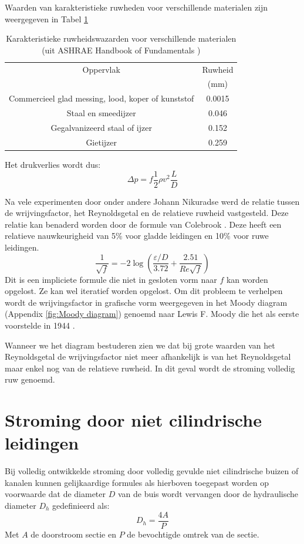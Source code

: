 Waarden van karakteristieke ruwheden voor verschillende materialen zijn weergegeven in Tabel \ref{tab:ruwheid van materialen}
\begin{table}[htb]
	\centering
	\begin{tabular}{cc}
		\hline
		Oppervlak & Ruwheid \\
		   & (mm) \\
		\hline
		Commercieel glad messing, lood, koper of kunststof & 0.0015 \\
		Staal en smeedijzer & 0.046 \\
		Gegalvanizeerd staal of ijzer & 0.152 \\
		Gietijzer & 0.259 \\
		\hline
	\end{tabular}
	\caption{Karakteristieke ruwheidswazarden voor verschillende materialen (uit ASHRAE Handbook of Fundamentals \cite{ASHRAE_Fundamentals})}
	\label{tab:ruwheid van materialen}
\end{table}
Het drukverlies wordt dus:
\begin{equation}
	\Delta p = f \frac{1}{2}\rho v^2 \frac{L}{D}
	\label{eqn:drukval bij turbulente stroming}
\end{equation}

Na vele experimenten door onder andere Johann Nikuradse \cite{Nikuradse1926} werd de relatie tussen de wrijvingsfactor, het Reynoldsgetal en de relatieve ruwheid vastgesteld. Deze relatie kan benaderd worden door de formule van Colebrook \cite{Colebrook1937}. Deze heeft een relatieve nauwkeurigheid van 5\% voor gladde leidingen en 10\% voor ruwe leidingen.
\begin{equation}
	\frac{1}{\sqrt{f}} = -2 \log \left( \frac{\varepsilon/D}{3.72} + \frac{2.51}{Re \sqrt{f}} \right)
\end{equation}
Dit is een impliciete formule die niet in gesloten vorm naar $f$ kan worden opgelost. Ze kan wel iteratief worden opgelost.  Om dit probleem te verhelpen wordt de wrijvingsfactor in grafische vorm weergegeven in het Moody diagram (Appendix \ref{fig:Moody diagram}) genoemd naar Lewis F. Moody die het als eerste voorstelde in 1944 \cite{Moody1944}.

Wanneer we het diagram bestuderen zien we dat bij grote waarden van het Reynoldsgetal de wrijvingsfactor niet meer afhankelijk is van het Reynoldsgetal maar enkel nog van de relatieve ruwheid. In dit geval wordt de stroming volledig ruw genoemd.

		\section{Stroming door niet cilindrische leidingen}
Bij volledig ontwikkelde stroming door volledig gevulde niet cilindrische buizen of kanalen kunnen gelijkaardige formules als hierboven toegepast worden op voorwaarde dat de diameter $D$ van de buis wordt vervangen door de hydraulische diameter $D_h$ gedefinieerd als:
\begin{equation}
	D_h = \frac{4 A}{P}
\end{equation}
Met $A$ de doorstroom sectie en $P$ de bevochtigde omtrek van de sectie.
	


